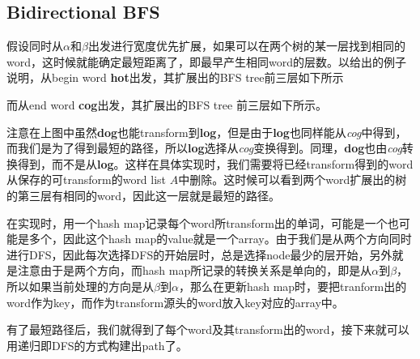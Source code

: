 \subsection{Bidirectional BFS}
\begin{CJK*}{UTF8}{gbsn}
假设同时从$\alpha$和$\beta$出发进行宽度优先扩展，如果可以在两个树的某一层找到相同的word，这时候就能确定最短距离了，即最早产生相同word的层数。以给出的例子说明，从begin word \textbf{hot}出发，其扩展出的BFS tree前三层如下所示
\end{CJK*}
\begin{figure}[H]
\end{figure}
\begin{CJK*}{UTF8}{gbsn}
而从end word \textbf{cog}出发，其扩展出的BFS tree 前三层如下所示。
\end{CJK*}
\begin{figure}[H]
\end{figure}
\begin{CJK*}{UTF8}{gbsn}
注意在上图中虽然\textbf{dog}也能transform到\textbf{log}，但是由于\textbf{log}也同样能从\textit{cog}中得到，而我们是为了得到最短的路径，所以\textbf{log}选择从\textit{cog}变换得到。同理，\textbf{dog}也由\textit{cog}转换得到，而不是从\textbf{log}。这样在具体实现时，我们需要将已经transform得到的word从保存的可transform的word list $A$中删除。这时候可以看到两个word扩展出的树的第三层有相同的word，因此这一层就是最短的路径。
\par
在实现时，用一个hash map记录每个word所transform出的单词，可能是一个也可能是多个，因此这个hash map的value就是一个array。由于我们是从两个方向同时进行DFS，因此每次选择DFS的开始层时，总是选择node最少的层开始，另外就是注意由于是两个方向，而hash map所记录的转换关系是单向的，即是从$\alpha$到$\beta$，所以如果当前处理的方向是从$\beta$到$\alpha$，那么在更新hash map时，要把tranform出的word作为key，而作为transform源头的word放入key对应的array中。
\par
有了最短路径后，我们就得到了每个word及其transform出的word，接下来就可以用递归即DFS的方式构建出path了。
\end{CJK*}
